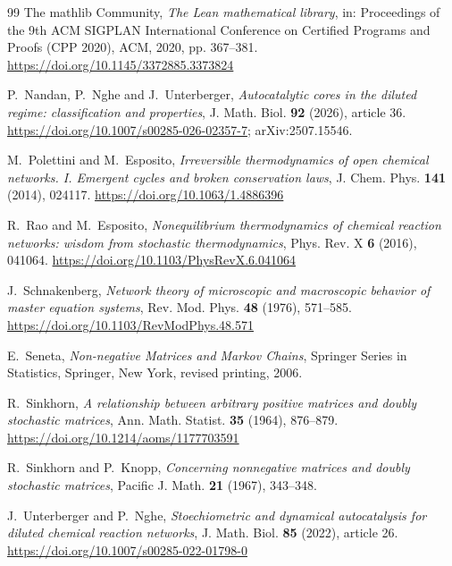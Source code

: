 \documentclass[11pt,reqno]{amsart}
\theoremstyle{plain}
\theoremstyle{definition}
\theoremstyle{remark}
\numberwithin{equation}{section}
\begin{document}
\begin{thebibliography}{99}
The mathlib Community,
\emph{The Lean mathematical library},
in: Proceedings of the 9th ACM SIGPLAN International Conference on Certified Programs and Proofs (CPP 2020), ACM, 2020, pp. 367--381.
\url{https://doi.org/10.1145/3372885.3373824}

P.~Nandan, P.~Nghe and J.~Unterberger,
\emph{Autocatalytic cores in the diluted regime: classification and properties},
J. Math. Biol. \textbf{92} (2026), article 36.
\url{https://doi.org/10.1007/s00285-026-02357-7}; arXiv:2507.15546.

M.~Polettini and M.~Esposito,
\emph{Irreversible thermodynamics of open chemical networks. I. Emergent cycles and broken conservation laws},
J. Chem. Phys. \textbf{141} (2014), 024117.
\url{https://doi.org/10.1063/1.4886396}

R.~Rao and M.~Esposito,
\emph{Nonequilibrium thermodynamics of chemical reaction networks: wisdom from stochastic thermodynamics},
Phys. Rev. X \textbf{6} (2016), 041064.
\url{https://doi.org/10.1103/PhysRevX.6.041064}

J.~Schnakenberg,
\emph{Network theory of microscopic and macroscopic behavior of master equation systems},
Rev. Mod. Phys. \textbf{48} (1976), 571--585.
\url{https://doi.org/10.1103/RevModPhys.48.571}

E.~Seneta,
\emph{Non-negative Matrices and Markov Chains},
Springer Series in Statistics, Springer, New York, revised printing, 2006.

R.~Sinkhorn,
\emph{A relationship between arbitrary positive matrices and doubly stochastic matrices},
Ann. Math. Statist. \textbf{35} (1964), 876--879.
\url{https://doi.org/10.1214/aoms/1177703591}

R.~Sinkhorn and P.~Knopp,
\emph{Concerning nonnegative matrices and doubly stochastic matrices},
Pacific J. Math. \textbf{21} (1967), 343--348.

J.~Unterberger and P.~Nghe,
\emph{Stoechiometric and dynamical autocatalysis for diluted chemical reaction networks},
J. Math. Biol. \textbf{85} (2022), article 26.
\url{https://doi.org/10.1007/s00285-022-01798-0}

\end{thebibliography}
\end{document}
